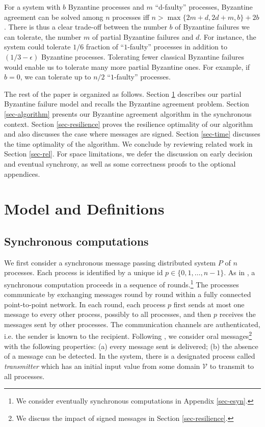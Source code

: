 \documentclass[11pt,conference,compsoc,onecolumn,romanappendices]{IEEEtran}
\newcommand{\tmem}[1]{{\em #1\/}}
\begin{document}
For a system with $b$ Byzantine processes and $m$ ``d-faulty'' processes, 
Byzantine agreement can be solved among $n$ processes iff
$n > \max \{2 m  + d, 2 d + m, b\}+ 2 b$.    There is thus a clear trade-off between
the number $b$ of Byzantine failures we can tolerate, the number $m$ of  partial
Byzantine failures and $d$.   For instance, the system
could tolerate $1 / 6$ fraction of ``$1$-faulty'' processes in addition to $(1 / 3 - \epsilon)$
Byzantine processes. Tolerating fewer classical Byzantine  failures
would enable us to tolerate many more partial Byzantine ones.
For example, if $b = 0$, we can tolerate up to $n / 2$ ``$1$-faulty'' processes.

The rest of the paper is organized as follows. 
Section \ref{sec-model} describes our partial Byzantine failure model and recalls the Byzantine agreement problem. 
Section \ref{sec-algorithm} presents our Byzantine agreement algorithm in the synchronous context. 
Section \ref{sec-resilience} proves the resilience optimality of our algorithm and also discusses the case where messages are signed.
Section \ref{sec-time} discusses the time optimality of the algorithm.
We conclude by reviewing related work in Section \ref{sec-rel}.
For space limitations, we defer the discussion on early decision and eventual synchrony, 
as well as some correctness proofs to the optional appendices.

\medskip

\section{Model and Definitions}\label{sec-model}

\subsection{Synchronous computations}

We first consider a synchronous message passing distributed system $P$ of $n$
processes. Each process is identified by a unique id $p \in \{0, 1, \ldots, n
- 1\}$.
As in {\cite{lamport1982byzantine,toueg1984simple}}, a
synchronous computation proceeds in a sequence of rounds.\footnote{We
consider eventually synchronous computations in Appendix \ref{sec-esyn}.}
The processes communicate by exchanging messages round by round within a fully
connected point-to-point network. In each round, each process $p$ first sends at
most one message to every other process, possibly to all processes, and then
$p$ receives the messages sent by other processes. The communication channels
are authenticated, i.e. the sender is known to the recipient. Following
{\cite{lamport1982byzantine}}, we consider oral messages\footnote{We discuss the impact of signed messages in Section \ref{sec-resilience}.}
with the following properties:
(a) every message sent is delivered;
(b) the absence of a message can be detected.
In the system, there is a designated process called \tmem{transmitter} which has
an initial input value from some domain $\mathcal{V}$ to transmit to all processes.
\end{document}

